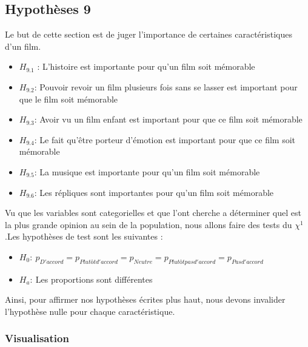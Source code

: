 \documentclass{article} %
\begin{document}
\subsection{Hypothèses 9}
Le but de cette section est de juger l’importance de certaines caractéristiques d’un film.
\begin{itemize}
	\item $H_{9.1}$ : L’histoire est importante pour qu’un film soit mémorable
	\item $H_{9.2}$: Pouvoir revoir un film plusieurs fois sans se lasser est important pour que le film soit mémorable
	\item $H_{9.3}$: Avoir vu un film enfant est important pour que ce film soit mémorable
	\item $H_{9.4}$: Le fait qu’être porteur d’émotion est important pour que ce film soit mémorable
	\item $H_{9.5}$: La musique est importante pour qu’un film soit mémorable
	\item $H_{9.6}$: Les répliques sont importantes pour qu’un film soit mémorable
\end{itemize}
Vu que les variables sont categorielles et que l'ont cherche a déterminer quel est la plus grande opinion au sein de la population, nous allons faire des tests du $\chi^1$.Les hypothèses de test sont les suivantes :
\begin{itemize}
	\item $H_0: \ p_{D'accord}=p_{Plutôt d'accord} = p_{Neutre} = p_{Plutôt pas d'accord}= p_{Pas d'accord}$ 
	\item $H_a: \ $Les proportions sont différentes
\end{itemize}
Ainsi, pour affirmer nos hypothèses écrites plus haut, nous devons invalider l’hypothèse nulle pour chaque caractéristique.

\subsubsection{Visualisation}
\end{document}

